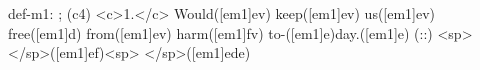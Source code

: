 def-m1: \grealign;
(c4) <c>1.</c> Would([em1]ev) keep([em1]ev) us([em1]ev) free([em1]d) from([em1]ev) harm([em1]fv) to-([em1]e)day.([em1]e) (::) <sp> </sp>([em1]ef)<sp>   </sp>([em1]ede)